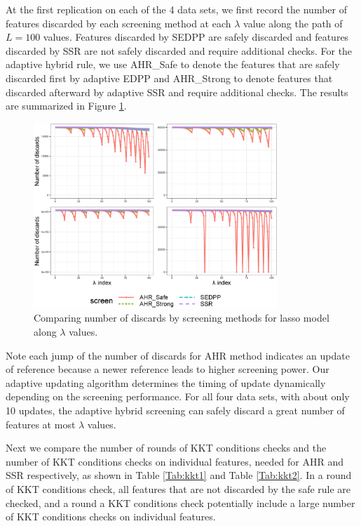 \documentclass[]{interact}
\theoremstyle{plain}%
\theoremstyle{definition}
\theoremstyle{remark}
\begin{document}
At the first replication on each of the 4 data sets, we first record the number of features discarded by each screening method at each $\lambda$ value along the path of $L=100$ values. Features discarded by SEDPP are safely discarded and features discarded by SSR are not safely discarded and require additional checks. For the adaptive hybrid rule, we use AHR\_Safe to denote the features that are safely discarded first by adaptive EDPP and AHR\_Strong to denote features that discarded afterward by adaptive SSR and require additional checks. The results are summarized in Figure \ref{fig:ap1}.

\begin{figure}[H]
    \centering
    \includegraphics[width=0.82\textwidth]{app1.eps}    \caption{Comparing number of discards by screening methods for lasso model along $\lambda$ values.}
    \label{fig:ap1}
\end{figure}

Note each jump of the number of discards for AHR method indicates an update of reference because a newer reference leads to higher screening power. Our adaptive updating algorithm determines the timing of update dynamically depending on the screening performance. For all four data sets, with about only 10 updates, the adaptive hybrid screening can safely discard a great number of features at most $\lambda$ values.

Next we compare the number of rounds of KKT conditions checks and the number of KKT conditions checks on individual features, needed for AHR and SSR respectively, as shown in Table \ref{Tab:kkt1} and Table \ref{Tab:kkt2}. In a round of KKT conditions check, all features that are not discarded by the safe rule are checked, and a round a KKT conditions check potentially include a large number of KKT conditions checks on individual features. 
\end{document}
